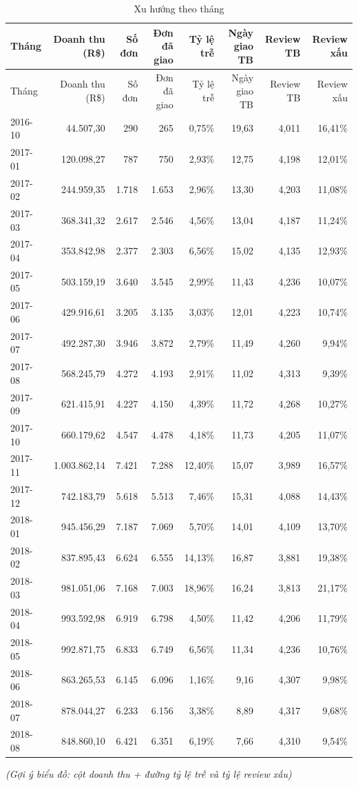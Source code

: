 \documentclass[12pt,a4paper]{report}
\newcommand{\bieudo}[1]{\par{\small\textit{(Gợi ý biểu đồ: #1)}}\par}
\renewcommand{\_}{\oldunderscore\allowbreak}
\begin{document}
\begingroup\small
\setlength{\tabcolsep}{4pt}
\begin{longtable}{lrrrrrrr}
\caption{Xu hướng theo tháng}\\
\toprule
Tháng & Doanh thu (R\$) & Số đơn & Đơn đã giao & Tỷ lệ trễ & Ngày giao TB & Review TB & Review xấu \\
\midrule\endfirsthead
\toprule
Tháng & Doanh thu (R\$) & Số đơn & Đơn đã giao & Tỷ lệ trễ & Ngày giao TB & Review TB & Review xấu \\
\midrule\endhead
2016-10 & 44.507,30 & 290 & 265 & 0,75\% & 19,63 & 4,011 & 16,41\% \\
2017-01 & 120.098,27 & 787 & 750 & 2,93\% & 12,75 & 4,198 & 12,01\% \\
2017-02 & 244.959,35 & 1.718 & 1.653 & 2,96\% & 13,30 & 4,203 & 11,08\% \\
2017-03 & 368.341,32 & 2.617 & 2.546 & 4,56\% & 13,04 & 4,187 & 11,24\% \\
2017-04 & 353.842,98 & 2.377 & 2.303 & 6,56\% & 15,02 & 4,135 & 12,93\% \\
2017-05 & 503.159,19 & 3.640 & 3.545 & 2,99\% & 11,43 & 4,236 & 10,07\% \\
2017-06 & 429.916,61 & 3.205 & 3.135 & 3,03\% & 12,01 & 4,223 & 10,74\% \\
2017-07 & 492.287,30 & 3.946 & 3.872 & 2,79\% & 11,49 & 4,260 & 9,94\% \\
2017-08 & 568.245,79 & 4.272 & 4.193 & 2,91\% & 11,02 & 4,313 & 9,39\% \\
2017-09 & 621.415,91 & 4.227 & 4.150 & 4,39\% & 11,72 & 4,268 & 10,27\% \\
2017-10 & 660.179,62 & 4.547 & 4.478 & 4,18\% & 11,73 & 4,205 & 11,07\% \\
2017-11 & 1.003.862,14 & 7.421 & 7.288 & 12,40\% & 15,07 & 3,989 & 16,57\% \\
2017-12 & 742.183,79 & 5.618 & 5.513 & 7,46\% & 15,31 & 4,088 & 14,43\% \\
2018-01 & 945.456,29 & 7.187 & 7.069 & 5,70\% & 14,01 & 4,109 & 13,70\% \\
2018-02 & 837.895,43 & 6.624 & 6.555 & 14,13\% & 16,87 & 3,881 & 19,38\% \\
2018-03 & 981.051,06 & 7.168 & 7.003 & 18,96\% & 16,24 & 3,813 & 21,17\% \\
2018-04 & 993.592,98 & 6.919 & 6.798 & 4,50\% & 11,42 & 4,206 & 11,79\% \\
2018-05 & 992.871,75 & 6.833 & 6.749 & 6,56\% & 11,34 & 4,236 & 10,76\% \\
2018-06 & 863.265,53 & 6.145 & 6.096 & 1,16\% & 9,16 & 4,307 & 9,98\% \\
2018-07 & 878.044,27 & 6.233 & 6.156 & 3,38\% & 8,89 & 4,317 & 9,68\% \\
2018-08 & 848.860,10 & 6.421 & 6.351 & 6,19\% & 7,66 & 4,310 & 9,54\% \\
\bottomrule
\end{longtable}
\endgroup
\bieudo{cột doanh thu + đường tỷ lệ trễ và tỷ lệ review xấu}
\end{document}
